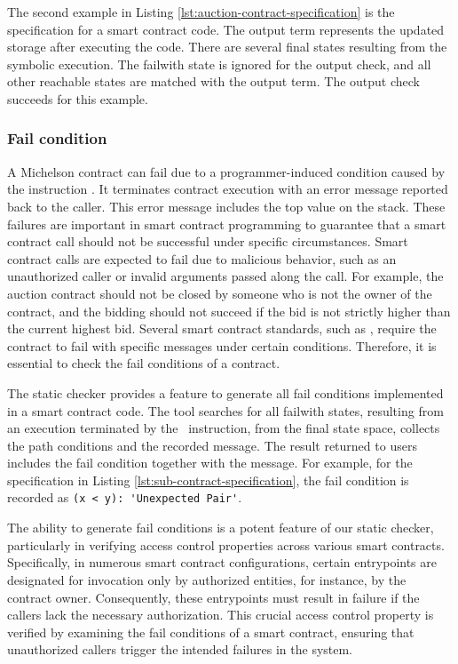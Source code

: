 \documentclass[a4paper,USenglish,cleveref, autoref,anonymous]{lipics-v2021}
\begin{document}
The second example in Listing \ref{lst:auction-contract-specification}
is the specification for a smart contract code. The output term
represents the updated storage after executing the code. There are
several final states resulting from the symbolic execution. The
failwith state is ignored for the output check, and all other
reachable states are matched with the output term. The output check
succeeds for this example.

\subsubsection{Fail condition}
\label{sec:fail-condition}
A Michelson contract can fail due to a programmer-induced condition
caused by the instruction \FAILWITH. It terminates contract execution
with an error message reported back to the caller. This error message
includes the top value on the stack. These failures are important in
smart contract programming to guarantee that a smart contract call
should not be successful under specific circumstances. Smart contract
calls are expected to fail due to malicious behavior, such as an
unauthorized caller or invalid arguments passed along the call. For
example, the auction contract should not be closed by someone who is
not the owner of the contract, and the bidding should not succeed if
the bid is not strictly higher than the current highest bid. Several
smart contract standards, such as
\cite{erc, fa}, require the contract to fail
with specific messages under certain conditions. Therefore, it is
essential to check the fail conditions of a contract.  

The static checker provides a feature to generate all fail conditions
implemented in a smart contract code. The tool searches for all
failwith states, resulting from an execution terminated by the
\FAILWITH\ instruction, from the final state space, collects the path
conditions and the recorded message. The result returned to users
includes the fail condition together with the message. For example,
for the specification in Listing \ref{lst:sub-contract-specification},
the fail condition is recorded as
\lstinline/(x < y): 'Unexpected Pair'/.  

The ability to generate fail conditions is a potent feature of our
static checker, particularly in verifying access control properties
across various smart contracts. Specifically, in numerous smart
contract configurations, certain entrypoints are designated for
invocation only by authorized entities, for instance, by the contract
owner. Consequently, these entrypoints must result in failure if the
callers lack the necessary authorization. This crucial access control
property is verified by examining the fail conditions of a smart
contract, ensuring that unauthorized callers trigger the intended
failures in the system. 
\end{document}

